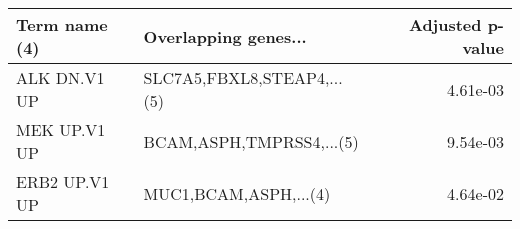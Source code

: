 \begin{tabular}{llr}
\toprule
Term name (4) &       Overlapping genes... &  Adjusted p-value \\
\midrule
 ALK DN.V1 UP & SLC7A5,FBXL8,STEAP4,...(5) &          4.61e-03 \\
 MEK UP.V1 UP &   BCAM,ASPH,TMPRSS4,...(5) &          9.54e-03 \\
ERB2 UP.V1 UP &      MUC1,BCAM,ASPH,...(4) &          4.64e-02 \\
\bottomrule
\end{tabular}
